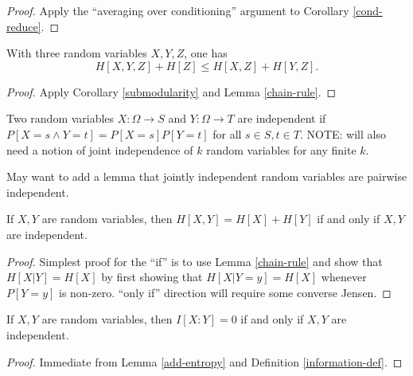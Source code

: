 \begin{proof}  Apply the ``averaging over conditioning'' argument to Corollary \ref{cond-reduce}.
\end{proof}

\begin{corollary}\label{alt-submodularity} With three random variables $X,Y,Z$, one has
  $$ H[X,Y,Z] + H[Z] \leq H[X,Z] + H[Y,Z].$$
\end{corollary}

\begin{proof}   Apply Corollary \ref{submodularity} and Lemma \ref{chain-rule}.
\end{proof}

\begin{definition}\label{independent-def}
Two random variables $X: \Omega \to S$ and $Y: \Omega \to T$ are independent if $P[ X = s \wedge Y = t] = P[X=s] P[Y=t]$ for all $s \in S, t \in T$.  NOTE: will also need a notion of joint independence of $k$ random variables for any finite $k$.
\end{definition}

May want to add a lemma that jointly independent random variables are pairwise independent.

\begin{lemma}\label{add-entropy}  If $X,Y$ are random variables, then $H[X,Y] = H[X] + H[Y]$ if and only if $X,Y$ are independent.
\end{lemma}

\begin{proof}  Simplest proof for the ``if'' is to use Lemma \ref{chain-rule} and show that $H[X|Y] = H[X]$ by first showing that $H[X|Y=y] = H[X]$ whenever $P[Y=y]$ is non-zero.  ``only if'' direction will require some converse Jensen.
\end{proof}


\begin{corollary}\label{vanish-entropy}  If $X,Y$ are random variables, then $I[X:Y] = 0$ if and only if $X,Y$ are independent.
\end{corollary}

\begin{proof}  Immediate from Lemma \ref{add-entropy} and Definition \ref{information-def}.
\end{proof}

